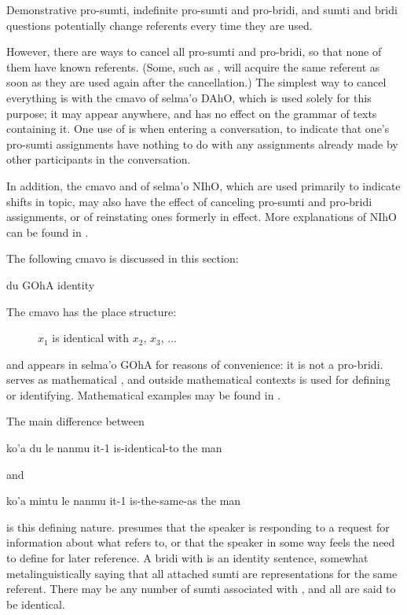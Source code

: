 Demonstrative pro-sumti, indefinite pro-sumti and pro-bridi,
    and sumti and bridi questions potentially change referents
    every time they are used.

However, there are ways to cancel all pro-sumti and
    pro-bridi, so that none of them have known referents. (Some,
    such as , will acquire the same referent as soon as they
    are used again after the cancellation.) The simplest way to
    cancel everything is with the cmavo  of selma'o DAhO,
    which is used solely for this purpose; it may appear anywhere,
    and has no effect on the grammar of texts containing it. One
    use of  is when entering a conversation, to indicate
    that one's pro-sumti assignments have nothing to do with any
    assignments already made by other participants in the
    conversation.

In addition, the cmavo  and  of selma'o
    NIhO, which are used primarily to indicate shifts in topic, may
    also have the effect of canceling pro-sumti and pro-bridi
    assignments, or of reinstating ones formerly in effect. More
    explanations of NIhO can be found in .



The following cmavo is discussed in this section:

   du  GOhA            identity

The cmavo  has the place structure: 
\begin{description}
\item[] $x_1$ is identical with $x_2$, $x_3$, ...
\end{description}

and appears in selma'o GOhA for reasons of convenience: it is
    not a pro-bridi.  serves as mathematical \q{=}, and
    outside mathematical contexts is used for defining or
    identifying. Mathematical examples may be found in . 

The main difference between
\begin{example}
ko'a du le nanmu\n
it-1 is-identical-to the man
\end{example}

{\noindent}and
\begin{example}
ko'a mintu le nanmu\n
it-1 is-the-same-as the man
\end{example}

{\noindent}is this defining nature. 
    presumes that the speaker is responding to a request for
    information about what  refers to, or that the speaker
    in some way feels the need to define  for later
    reference. A bridi with  is an identity sentence,
    somewhat metalinguistically saying that all attached sumti are
    representations for the same referent. There may be any number
    of sumti associated with , and all are said to be
    identical. 


